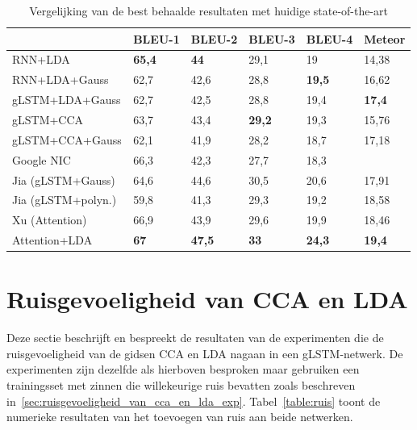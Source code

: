 \begin{table}
	\centering
	\begin{tabular}{llllll}
		~                  & BLEU-1 & BLEU-2 & BLEU-3 & BLEU-4 & Meteor \\ \hline
		RNN+LDA            & \textbf{65,4}   & \textbf{44}     & 29,1   & 19     & 14,38  \\
		RNN+LDA+Gauss      & 62,7   & 42,6   & 28,8   & \textbf{19,5}   & 16,62  \\
		gLSTM+LDA+Gauss    & 62,7   & 42,5   & 28,8   & 19,4   & \textbf{17,4}   \\
		gLSTM+CCA          & 63,7   & 43,4   & \textbf{29,2}   & 19,3   & 15,76  \\
		gLSTM+CCA+Gauss    & 62,1   & 41,9   & 28,2   & 18,7   & 17,18  \\ \hline
		
		Google NIC~\cite{Google}           & 66,3   & 42,3   & 27,7   & 18,3   & ~      \\
		Jia (gLSTM+Gauss)~\cite{Fernando2015}  & 64,6   & 44,6   & 30,5   & 20,6   & 17,91  \\
		Jia (gLSTM+polyn.)~\cite{Fernando2015} & 59,8   & 41,3   & 29,3   & 19,2   & 18,58  \\
		Xu (Attention)~\cite{Xu2015}     & 66,9   & 43,9   & 29,6   & 19,9   & 18,46  \\
		Attention+LDA~\cite{Jin2015}      & \textbf{67}    & \textbf{47,5}   & \textbf{33}     & \textbf{24,3}   & \textbf{19,4}   \\ \hline
	\end{tabular}
	\caption{Vergelijking van de best behaalde resultaten met huidige state-of-the-art}
	\label{table:sota}
\end{table}

\section{Ruisgevoeligheid van CCA en LDA} %
\label{sec:ruisgevoeligheid_van_cca_en_lda_res}
Deze sectie beschrijft en bespreekt de resultaten van de experimenten die de ruisgevoeligheid van de gidsen CCA en LDA nagaan in een gLSTM-netwerk.
De experimenten zijn dezelfde als hierboven besproken maar gebruiken een trainingsset met zinnen die willekeurige ruis bevatten zoals beschreven in~\ref{sec:ruisgevoeligheid_van_cca_en_lda_exp}.
Tabel~\ref{table:ruis} toont de numerieke resultaten van het toevoegen van ruis aan beide netwerken.

